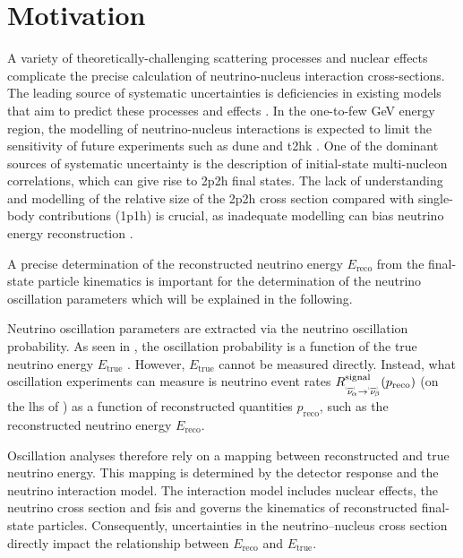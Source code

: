 \section{Motivation} \label{motivation_syst} 
%
A variety of theoretically-challenging scattering processes and nuclear effects complicate the precise calculation of neutrino-nucleus interaction cross-sections. The leading source of systematic uncertainties is deficiencies in existing models that aim to predict these processes and effects \cite{Alvarez_Ruso_2018,Benhar:2013bwa,Megias:2019pol,PhysRevD.92.051302,Lu:2018stk,Munteanu:2019llq}. In the one-to-few GeV energy region, the modelling of neutrino-nucleus interactions is expected to limit the sensitivity of future experiments such as \acrshort{dune} and \acrshort{t2hk} \cite{NuSTEC:2017hzk}. One of the dominant sources of systematic uncertainty is the description of initial-state multi-nucleon correlations, which can give rise to \acrshort{2p2h} final states. The lack of understanding and modelling of the relative size of the \acrshort{2p2h} cross section compared with single-body contributions (\acrshort{1p1h}) is crucial, as inadequate modelling can bias neutrino energy reconstruction \cite{Dolan:2019bxf}. 

A precise determination of the reconstructed neutrino energy $E_\text{reco}$ from the final-state particle kinematics is important for the determination of the neutrino oscillation parameters which will be explained in the following.


Neutrino oscillation parameters are extracted via the neutrino oscillation probability. As seen in , the oscillation probability is a function of the true neutrino energy $E_\text{true}$ \cite{ALVAREZRUSO20181}. However, $E_\text{true}$ cannot be measured directly. Instead, what oscillation experiments can measure is neutrino event rates $R^\text{signal}_{\overset{\brobor}{\nu}_{\hspace{-1mm}\alpha}\rightarrow\overset{\brobor}{\nu}_{\hspace{-1mm}\beta}}(p_\text{reco})$ (on the lhs of ) as a function of reconstructed quantities $p_\text{reco}$, such as the reconstructed neutrino energy $E_\text{reco}$. 

Oscillation analyses therefore rely on a mapping between reconstructed and true neutrino energy. This mapping is determined by the detector response and the neutrino interaction model. The interaction model includes nuclear effects, the neutrino cross section and \acrshort{fsi}s and governs the kinematics of reconstructed final-state particles. Consequently, uncertainties in the neutrino–nucleus cross section directly impact the relationship between $E_\text{reco}$ and $E_\text{true}$.

